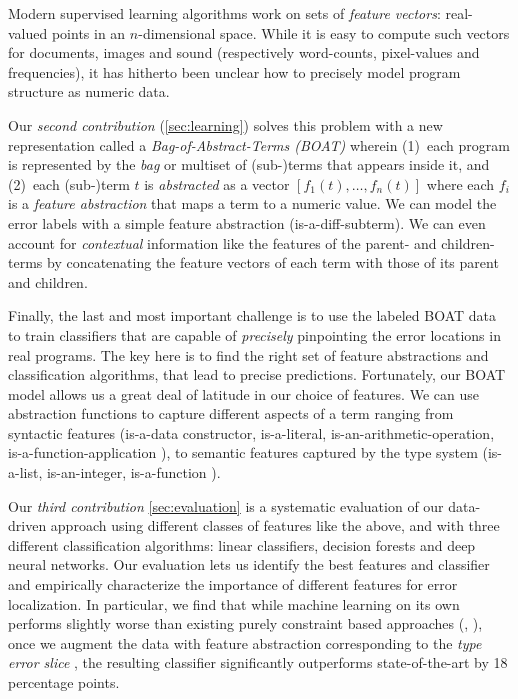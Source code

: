 %
Modern supervised learning algorithms work on sets of
\emph{feature vectors}: real-valued points in an
$n$-dimensional space. While it is easy to compute such
vectors for documents, images and sound (respectively
word-counts, pixel-values and frequencies), it has
hitherto been unclear how to precisely model program
structure as numeric data.

Our \emph{second contribution} (\autoref{sec:learning})
solves this problem with a new representation called
a \emph{Bag-of-Abstract-Terms (BOAT)} wherein
%
(1)~each program is represented by the \emph{bag}
    or multiset of (sub-)terms that appears inside
    it, and
%
(2)~each (sub-)term $t$ is \emph{abstracted} as
    a vector $[f_1(t), \ldots, f_n(t)]$ where
    each $f_i$ is a \emph{feature abstraction}
    that maps a term to a numeric value.
%
We can model the error labels with a simple feature
abstraction (\eg is-a-diff-subterm).
%
We can even account for \emph{contextual} information like
the features of the parent- and children- terms by
concatenating the feature vectors of each term with those
of its parent and children.

%
Finally, the last and most important challenge is to
use the labeled BOAT data to train classifiers that
are capable of \emph{precisely} pinpointing the error
locations in real programs.
%
The key here is to find the right set of feature
abstractions and classification algorithms, that
lead to precise predictions.
%
Fortunately, our BOAT model allows us a great deal of
latitude in our choice of features.
%
We can use abstraction functions to capture different
aspects of a term ranging from
%
syntactic features (\eg is-a-data constructor, is-a-literal,
is-an-arithmetic-operation, is-a-function-application \etc),
%
to semantic features captured by the type system (\eg is-a-list,
is-an-integer, is-a-function \etc).

Our \emph{third contribution} \autoref{sec:evaluation}
is a systematic evaluation of our data-driven approach
using different classes of features like the above, and
with three different classification algorithms: linear
classifiers, decision forests and deep neural networks.
%
Our evaluation lets us identify the best features and
classifier and empirically characterize the importance
of different features for error localization.
%
In particular, we find that while machine learning
on its own performs slightly worse than existing
purely constraint based approaches (\eg \ocaml, \sherrloc),
once we augment the data with feature abstraction
corresponding to the \emph{type error slice} \cite{Tip2001-qp},
the resulting classifier significantly outperforms
state-of-the-art by 18 percentage points.


